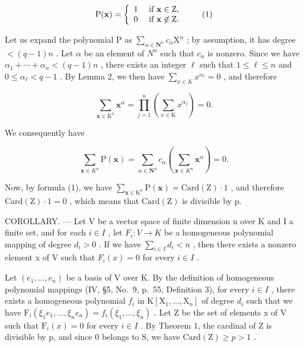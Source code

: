 \[
\mathrm{P} (\mathbf {x}) = \left\{ \begin{array}{l l} 1 & \text { if } \mathbf {x} \in \mathrm{Z}, \\ 0 & \text { if } \mathbf {x} \not \in \mathrm{Z}. \end{array} \right.\tag{1}
\]

Let us expand the polynomial P as \(\sum_{\alpha\in\mathbf{N}^{n}}c_{\alpha}\mathrm{X}^{\alpha}\) ; by assumption, it has degree \(< (q-1)n\) . Let \(\alpha\) be an element of \(N^{n}\) such that \(c_{\alpha}\) is nonzero. Since we have \(\alpha_{1}+\cdots+\alpha_{n}<(q-1)n\) , there exists an integer \(\ell\) such that \(1\leqslant\ell\leqslant n\) and \(0\leqslant\alpha_{\ell}<q-1\) . By Lemma 2, we then have \(\sum_{x\in K}x^{\alpha_{\ell}}=0\) , and therefore

\[
\sum_ {\mathbf {x} \in \mathrm{K} ^ {n}} \mathbf {x} ^ {\alpha} = \prod_ {j = 1} ^ {n} \left(\sum_ {x \in \mathrm{K}} x ^ {\alpha_ {j}}\right) = 0.
\]

We consequently have

\[
\sum_ {\mathbf {x} \in K ^ {n}} \mathrm{P} (\mathbf {x}) = \sum_ {\alpha \in \mathbf {N} ^ {n}} c _ {\alpha} \left(\sum_ {\mathbf {x} \in K ^ {n}} \mathbf {x} ^ {\alpha}\right) = 0.
\]

Now, by formula (1), we have \(\sum_{\mathbf{x}\in\mathrm{K}^{n}}\mathrm{P}(\mathbf{x})=\mathrm{Card}(\mathrm{Z})\cdot1\) , and therefore \(\mathrm{Card}(\mathrm{Z})\cdot1=0\) , which means that \(\mathrm{Card}(\mathrm{Z})\) is divisible by p.

COROLLARY. --- Let V be a vector space of finite dimension n over K and I a finite set, and for each \(i \in I\) , let \(F_{i}: V \to K\) be a homogeneous polynomial mapping of degree \(d_{i} > 0\) . If we have \(\sum_{i \in I} d_{i} < n\) , then there exists a nonzero element x of V such that \(F_{i}(x) = 0\) for every \(i \in I\) .

Let \((e_{1},\ldots,e_{n})\) be a basis of V over K. By the definition of homogeneous polynomial mappings (IV, §5, No.~9, p.~55, Definition 3), for every \(i\in I\) , there exists a homogeneous polynomial \(f_{i}\) in \(\mathrm{K}[\mathrm{X}_{1},\ldots,\mathrm{X}_{n}]\) of degree \(d_{i}\) such that we have \(\mathrm{F}_{i}(\xi_{1}e_{1},\ldots,\xi_{n}e_{n})=f_{i}(\xi_{1},\ldots,\xi_{n})\) . Let Z be the set of elements x of V such that \(\mathrm{F}_{i}(x)=0\) for every \(i\in I\) . By Theorem 1, the cardinal of Z is divisible by p, and since 0 belongs to S, we have \(\mathrm{Card}(\mathrm{Z})\geqslant p>1\) .


